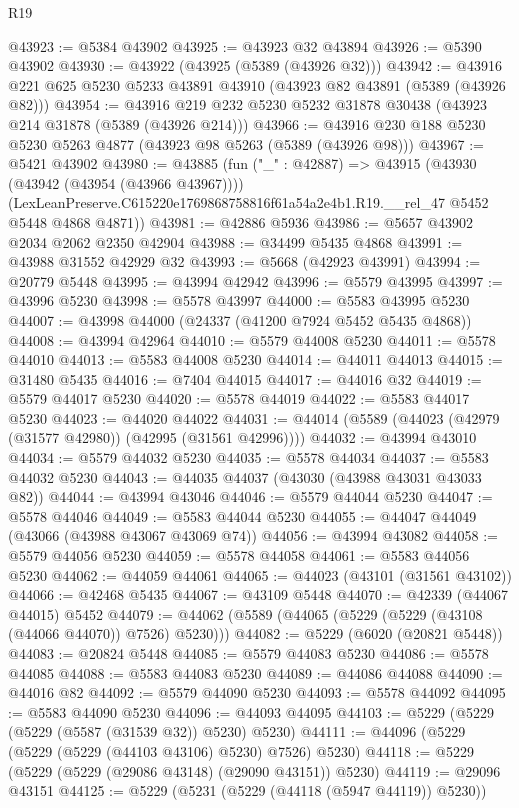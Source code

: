 \begin{lexlean}{R19}
\begin{coremodule}
@43923 := @5384 @43902
@43925 := @43923 @32 @43894
@43926 := @5390 @43902
@43930 := @43922 (@43925 (@5389 (@43926 @32)))
@43942 := @43916 @221 @625 @5230 @5233 @43891 @43910 (@43923 @82 @43891 (@5389 (@43926 @82)))
@43954 := @43916 @219 @232 @5230 @5232 @31878 @30438 (@43923 @214 @31878 (@5389 (@43926 @214)))
@43966 := @43916 @230 @188 @5230 @5230 @5263 @4877 (@43923 @98 @5263 (@5389 (@43926 @98)))
@43967 := @5421 @43902
@43980 := @43885
    (fun ("_" : @42887) =>
    @43915
      (@43930 (@43942 (@43954 (@43966 @43967))))
      (LexLeanPreserve.C615220e1769868758816f61a54a2e4b1.R19.__rel_47 @5452 @5448 @4868 @4871))
@43981 := @42886 @5936
@43986 := @5657 @43902 @2034 @2062 @2350 @42904
@43988 := @34499 @5435 @4868
@43991 := @43988 @31552 @42929 @32
@43993 := @5668 (@42923 @43991)
@43994 := @20779 @5448
@43995 := @43994 @42942
@43996 := @5579 @43995
@43997 := @43996 @5230
@43998 := @5578 @43997
@44000 := @5583 @43995 @5230
@44007 := @43998 @44000 (@24337 (@41200 @7924 @5452 @5435 @4868))
@44008 := @43994 @42964
@44010 := @5579 @44008 @5230
@44011 := @5578 @44010
@44013 := @5583 @44008 @5230
@44014 := @44011 @44013
@44015 := @31480 @5435
@44016 := @7404 @44015
@44017 := @44016 @32
@44019 := @5579 @44017 @5230
@44020 := @5578 @44019
@44022 := @5583 @44017 @5230
@44023 := @44020 @44022
@44031 := @44014 (@5589 (@44023 (@42979 (@31577 @42980)) (@42995 (@31561 @42996))))
@44032 := @43994 @43010
@44034 := @5579 @44032 @5230
@44035 := @5578 @44034
@44037 := @5583 @44032 @5230
@44043 := @44035 @44037 (@43030 (@43988 @43031 @43033 @82))
@44044 := @43994 @43046
@44046 := @5579 @44044 @5230
@44047 := @5578 @44046
@44049 := @5583 @44044 @5230
@44055 := @44047 @44049 (@43066 (@43988 @43067 @43069 @74))
@44056 := @43994 @43082
@44058 := @5579 @44056 @5230
@44059 := @5578 @44058
@44061 := @5583 @44056 @5230
@44062 := @44059 @44061
@44065 := @44023 (@43101 (@31561 @43102))
@44066 := @42468 @5435
@44067 := @43109 @5448
@44070 := @42339 (@44067 @44015) @5452
@44079 := @44062 (@5589 (@44065 (@5229 (@5229 (@43108 (@44066 @44070)) @7526) @5230)))
@44082 := @5229 (@6020 (@20821 @5448))
@44083 := @20824 @5448
@44085 := @5579 @44083 @5230
@44086 := @5578 @44085
@44088 := @5583 @44083 @5230
@44089 := @44086 @44088
@44090 := @44016 @82
@44092 := @5579 @44090 @5230
@44093 := @5578 @44092
@44095 := @5583 @44090 @5230
@44096 := @44093 @44095
@44103 := @5229 (@5229 (@5229 (@5587 (@31539 @32)) @5230) @5230)
@44111 := @44096 (@5229 (@5229 (@5229 (@44103 @43106) @5230) @7526) @5230)
@44118 := @5229 (@5229 (@5229 (@29086 @43148) (@29090 @43151)) @5230)
@44119 := @29096 @43151
@44125 := @5229 (@5231 (@5229 (@44118 (@5947 @44119)) @5230))

\end{coremodule}
\end{lexlean}
